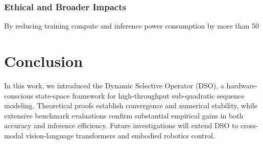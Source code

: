 \documentclass{article}
\begin{document}
\subsubsection{Ethical and Broader Impacts}
By reducing training compute and inference power consumption by more than 50%


\section{Conclusion}
In this work, we introduced the Dynamic Selective Operator (DSO), a hardware-conscious state-space framework for high-throughput sub-quadratic sequence modeling. Theoretical proofs establish convergence and numerical stability, while extensive benchmark evaluations confirm substantial empirical gains in both accuracy and inference efficiency. Future investigations will extend DSO to cross-modal vision-language transformers and embodied robotics control.




\end{document}
